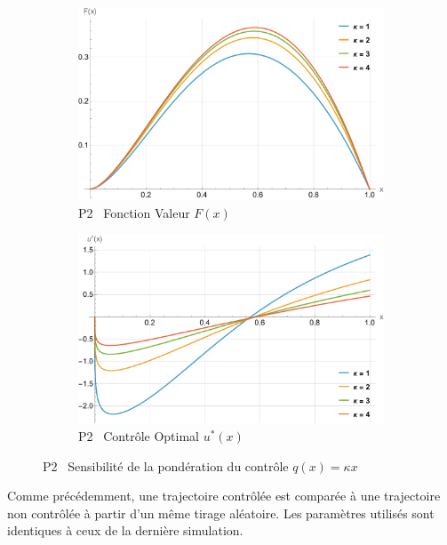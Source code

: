 \FloatBarrier\begin{figure}[htb]
    \centering
    \begin{subfigure}{0.45\linewidth}
        \includegraphics[width=\linewidth]{img/validation/P2/p2_K_value.pdf}
        \caption{P2 \textemdash~Fonction Valeur $F(x)$}\label{fig:KappaValueVisualisation2}
    \end{subfigure}
    \hfill
    \begin{subfigure}{0.45\linewidth}
        \includegraphics[width=\linewidth]{img/validation/P2/p2_K_control.pdf}
        \caption{P2 \textemdash~Contrôle Optimal $u^*(x)$}\label{fig:KappaControlVisualisation2}
    \end{subfigure}
    \caption{P2 \textemdash~Sensibilité de la pondération du contrôle $q(x)=\kappa x$}\label{fig:KappaValueControlComparison2}
\end{figure}
\FloatBarrier Comme précédemment, une trajectoire contrôlée est comparée à une trajectoire non contrôlée à partir d'un même tirage aléatoire. Les paramètres utilisés sont identiques à ceux de la dernière simulation.
